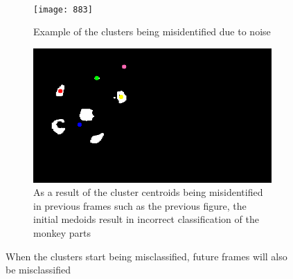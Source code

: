 \documentclass[12pt,a4paper]{article}
\begin{document}
        \
        \begin{figure}[H]
          \centering
          \begin{subfigure}[H]{0.49\textwidth}
            \texttt{[image: 883]}
            \caption{Example of the clusters being misidentified due to noise}
          \end{subfigure}
          \begin{subfigure}[H]{0.49\textwidth}
            \includegraphics[width=\linewidth]{952}
            \caption{As a result of the cluster centroids being misidentified in previous frames such as the previous figure, the initial medoids result in incorrect classification of the monkey parts}
          \end{subfigure}
        \caption{When the clusters start being misclassified, future frames will also be misclassified}
        \end{figure}


    \listoffigures
\end{document}
